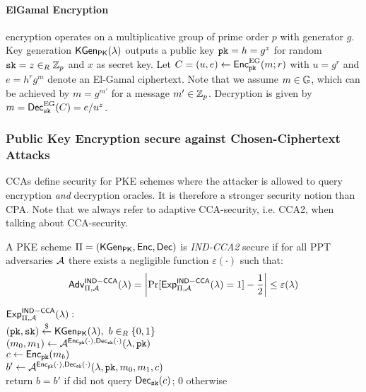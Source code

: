 \paragraph{ElGamal Encryption}\label{sec:elgamalencryption}
\citet{Gamal84} encryption operates on a multiplicative group \GG of prime order $p$ with generator $g$.
Key generation $\mathsf{KGen_{PK}}(\lambda)$ outputs a public key $\mathtt{pk}=h=g^z$ for random $\mathtt{sk}=z\in_R\mathbb{Z}_p$ and $x$ as secret key.
Let $C=(u,e)\gets\mathsf{Enc}^{\mathrm{EG}}_\mathtt{pk}(m;r)$ with $u=g^r$ and $e=h^rg^m$ denote an El-Gamal ciphertext.
Note that we assume $m\in\mathbb{G}$, which can be achieved by $m=g^{m'}$ for a message $m'\in\mathbb{Z}_p$.
Decryption is given by $m=\mathsf{Dec}_\mathtt{sk}^\mathrm{EG}(C)=e/u^z$.


\subsubsection{Public Key Encryption secure against Chosen-Ciphertext Attacks}
\acp{CCA} define security for \ac{PKE} schemes where the attacker is allowed to query encryption \emph{and} decryption oracles.
It is therefore a stronger security notion than \ac{CPA}.
Note that we always refer to adaptive \ac{CCA}-security, i.e. \ac{CCA}2, when talking about \ac{CCA}-security.

\begin{definition}\label{def:indcca2}
A \ac{PKE} scheme $\Pi=(\mathsf{KGen_{PK}},\mathsf{Enc},\mathsf{Dec})$ is \emph{IND-CCA2} secure if for all \ac{PPT} adversaries $\mathcal{A}$ there exists a negligible function $\varepsilon(\cdot)$ such that:
\[\mathsf{Adv}_{\Pi,\mathcal{A}}^{\mathsf{IND-CCA}}(\lambda)=\left|\Pr[\mathsf{Exp}^{\mathsf{IND-CCA}}_{\Pi,\mathcal{A}}(\lambda)=1]-\frac12\right|\leq\varepsilon(\lambda)\]

\noindent
$\mathsf{Exp}^{\mathsf{IND-CCA}}_{\Pi,\mathcal{A}}(\lambda):$\\
\hspace*{2em}$(\mathtt{pk},\mathtt{sk})\stackrel{\$}{\gets}\mathsf{KGen_{PK}}(\lambda),~b\in_R\{0,1\}$\\
\hspace*{2em}$(m_0,m_1)\gets\mathcal{A}^{\mathsf{Enc}_\mathtt{pk}(\cdot),\mathsf{Dec}_\mathtt{sk}(\cdot)}(\lambda,\mathtt{pk})$\\
\hspace*{2em}$c\gets\mathsf{Enc}_\mathtt{pk}(m_b)$\\
\hspace*{2em}$b'\gets\mathcal{A}^{\mathsf{Enc}_\mathtt{pk}(\cdot),\mathsf{Dec}_\mathtt{sk}(\cdot)}(\lambda,\mathtt{pk},m_0,m_1,c)$\\
\hspace*{2em}return $b=b'$ if \cA did not query $\mathsf{Dec}_\mathtt{sk}(c)$; $0$ otherwise
\eod
\end{definition}

